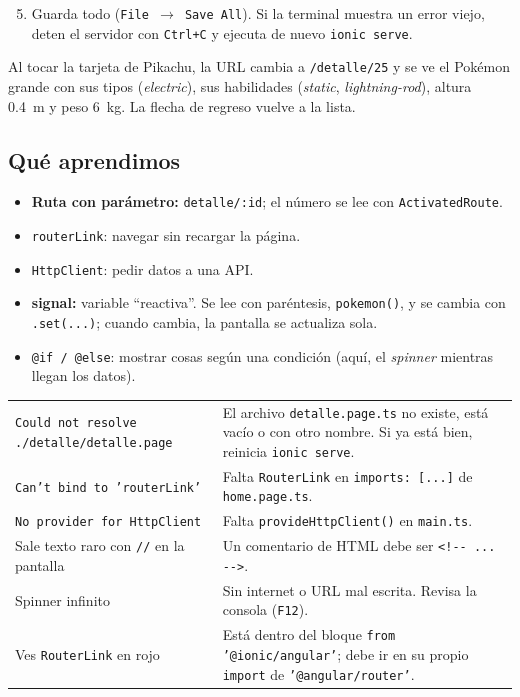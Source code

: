 \documentclass[11pt,a4paper]{article}
\newcommand{\cmd}[1]{\texttt{#1}}
\begin{document}
\begin{enumerate}\setcounter{enumi}{4}
\item Guarda todo (\texttt{File $\rightarrow$ Save All}). Si la terminal muestra un error viejo, deten el servidor con \texttt{Ctrl+C} y ejecuta de nuevo \cmd{ionic serve}.
\end{enumerate}

\begin{resultado}
Al tocar la tarjeta de Pikachu, la URL cambia a \texttt{/detalle/25} y se ve el Pok\'emon grande con sus tipos (\emph{electric}),
sus habilidades (\emph{static}, \emph{lightning-rod}), altura 0.4~m y peso 6~kg. La flecha de regreso vuelve a la lista.
\end{resultado}
\subsection*{Qu\'e aprendimos}
\begin{itemize}
\item \textbf{Ruta con par\'ametro:} \texttt{detalle/:id}; el n\'umero se lee con \cmd{ActivatedRoute}.
\item \cmd{routerLink}: navegar sin recargar la p\'agina.
\item \cmd{HttpClient}: pedir datos a una API.
\item \textbf{signal:} variable ``reactiva''. Se lee con par\'entesis, \cmd{pokemon()}, y se cambia con \cmd{.set(...)}; cuando cambia, la pantalla se actualiza sola.
\item \cmd{@if / @else}: mostrar cosas seg\'un una condici\'on (aqu\'i, el \emph{spinner} mientras llegan los datos).
\end{itemize}
\begin{alerta}
\begin{center}
\begin{tabularx}{\linewidth}{@{}>{\raggedright\arraybackslash}p{5.3cm} >{\raggedright\arraybackslash}X@{}}
\texttt{Could not resolve ./detalle/detalle.page} & El archivo \texttt{detalle.page.ts} no existe, est\'a vac\'io o con otro nombre. Si ya est\'a bien, reinicia \cmd{ionic serve}. \\
\texttt{Can't bind to 'routerLink'} & Falta \texttt{RouterLink} en \texttt{imports: [...]} de \texttt{home.page.ts}. \\
\texttt{No provider for HttpClient} & Falta \cmd{provideHttpClient()} en \texttt{main.ts}. \\
Sale texto raro con \texttt{//} en la pantalla & Un comentario de HTML debe ser \texttt{<!-{}- ... -{}->}. \\
Spinner infinito & Sin internet o URL mal escrita. Revisa la consola (\texttt{F12}). \\
Ves \texttt{RouterLink} en rojo & Est\'a dentro del bloque \texttt{from '@ionic/angular'}; debe ir en su propio \texttt{import} de \texttt{'@angular/router'}. \\
\end{tabularx}
\end{center}
\end{alerta}
\end{document}
